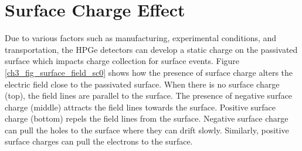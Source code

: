 \section{Surface Charge Effect}
Due to various factors such as manufacturing, experimental conditions, and transportation, the HPGe detectors can develop a static charge on the passivated surface which impacts charge collection for surface events. Figure \ref{ch3_fig_surface_field_sc0} shows how the presence of surface charge alters the electric field close to the passivated surface. When there is no surface charge (top), the field lines are parallel to the surface. The presence of negative surface charge (middle) attracts the field lines towards the surface. Positive surface charge (bottom) repels the field lines from the surface. Negative surface charge can pull the holes to the surface where they can drift slowly. Similarly, positive surface charges can pull the electrons to the surface.

